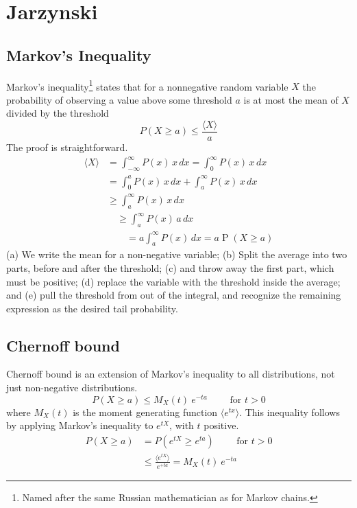 \documentclass[Lectures.tex]{subfiles}
\begin{document}
\clearpage
\section{Jarzynski}


\subsection{Markov's Inequality}

Markov's inequality\footnote{Named after the same Russian mathematician as for Markov chains.} states that for a nonnegative random variable $X$ the probability of observing a value above some threshold $a$ is at most the mean of $X$ divided by the threshold
\[
P(X\geq a) \leq \frac{\langle X \rangle}{a} 
\]
The proof is straightforward.
\begin{subequations}
\begin{align}
\langle X \rangle & =\int_{-\infty}^\infty P(x)\, x \, dx  = \int_0^\infty P(x)\, x \, dx \\
& = \int_0^a P(x)\, x \, dx + \int_a^\infty P(x)\, x \, dx \\
& \ge  \int_a^\infty P(x)\, x \, dx \\
& \quad \ge\int_a^\infty P(x)\, a \, dx 
\\
& \qquad = a\int_a^\infty P(x) \, dx= a \operatorname{P}(X \ge a)
\end{align}
\end{subequations}
(a) We write the mean for a non-negative variable; (b) Split the average into two parts, before and after the threshold; (c) and throw away the first part, which must be positive; (d) replace the variable with the threshold inside the average; and (e) pull the threshold from out of the integral, and recognize the remaining expression as the desired tail probability.


\subsection{Chernoff bound}
Chernoff bound is an extension of Markov's inequality to all distributions, not just non-negative distributions.
\[
 P\left(X \geq a \right) \leq M_X(t)\ e^{-t a} \qquad \text{ for } t > 0
\]
where $M_X(t)$ is the moment generating function $\langle e^{t x}\rangle$. This inequality follows by applying Markov's inequality to $e^{tX}$, with $t$ positive.
\begin{align*}
 P\left(X \geq a \right) & =  P \left(e^{t X} \geq e^{t a}\right) \qquad \text{ for } t > 0 \\
 & \leq \frac{\langle e^{t X}\rangle}{e^{+t a}} = M_X(t)\ e^{-t a} 
\end{align*} 
\end{document}
